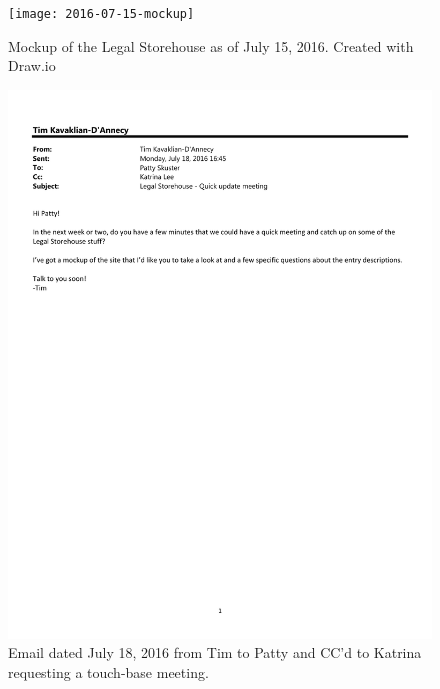 \begin{figure}
   \centering
      \noindent\texttt{[image: 2016-07-15-mockup]}\hfill
 \caption{Mockup of the Legal Storehouse as of July 15, 2016. Created with Draw.io}
 \label{fig:2016-07-15-mockup}
\end{figure}

\begin{figure}
   \centering
   \noindent\includegraphics[page=1,angle=-90,origin=c,width=.75\textwidth,height=.75\textheight]{documents/2016-07-18-Email-Tim-Patty}
 \caption{Email dated July 18, 2016 from Tim to Patty and CC'd to Katrina requesting a touch-base meeting.}
 \label{fig:2016-07-18-Email-Tim-Patty}
\end{figure}

